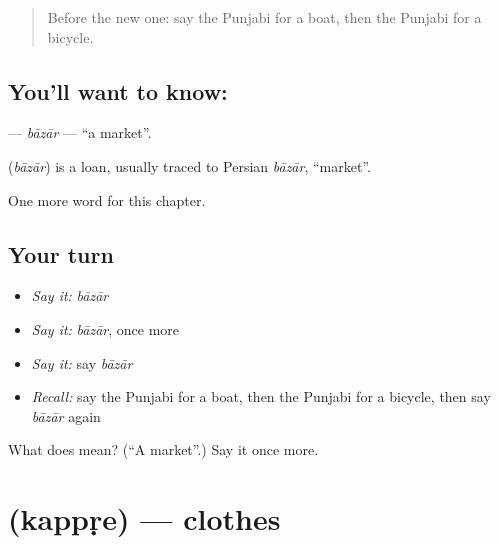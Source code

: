 \label{lesson:PA-C92-bazar}



\begin{quote}
Before the new one: say the Punjabi for a boat, then the Punjabi for a bicycle.
\end{quote}

\subsection*{You'll want to know: }
\textbf{} — \emph{bāzār} — \textquotedblleft{}a market\textquotedblright{}.

\begin{cousinweb}
\textbf{} (\emph{bāzār}) is a loan, usually traced to Persian \emph{bāzār}, \textquotedblleft{}market\textquotedblright{}.
\end{cousinweb}

\begin{grammarlens}[title={What you've built}]
One more word for this chapter.
\end{grammarlens}

\subsection*{Your turn}
\begin{itemize}
\raggedright
  \item \emph{Say it:} \emph{bāzār}
  \item \emph{Say it:} \emph{bāzār}, once more
  \item \emph{Say it:} say \emph{bāzār}
  \item \emph{Recall:} say the Punjabi for a boat, then the Punjabi for a bicycle, then say \emph{bāzār} again
\end{itemize}

\begin{tcolorbox}[breakable,colback=teal!4,colframe=teal!35!black,title={Before you move on}]
What does  mean? (\textquotedblleft{}A market\textquotedblright{}.) Say it once more.
\end{tcolorbox}
\section[\texorpdfstring{\pa{ਕੱਪੜੇ} (kappṛe)}{ਕੱਪੜੇ (kappṛe)}]{ (kappṛe) — clothes}

\label{lesson:PA-C92-kappre}



